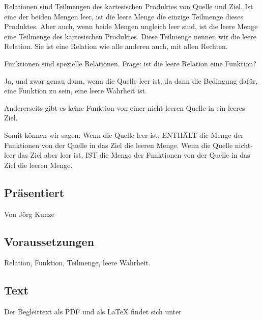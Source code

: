 \documentclass[a4paper]{amsart}
\theoremstyle{definition}
\begin{document}
Relationen sind Teilmengen des kartesischen Produktes von Quelle und Ziel. Ist eine der beiden Mengen leer, ist die leere Menge die einzige Teilmenge dieses Produktes. Aber auch, wenn beide Mengen ungleich leer sind, ist die leere Menge eine Teilmenge des kartesischen Produktes. Diese Teilmenge nennen wir die leere Relation. Sie ist eine Relation wie alle anderen auch, mit allen Rechten.

Funktionen sind spezielle Relationen. Frage: ist die leere Relation eine Funktion?

Ja, und zwar genau dann, wenn die Quelle leer ist, da dann die Bedingung dafür, eine Funktion zu sein, eine leere Wahrheit ist.

Andererseits gibt es keine Funktion von einer nicht-leeren Quelle in ein leeres Ziel. 

Somit können wir sagen:
Wenn die Quelle leer ist, ENTHÄLT die Menge der Funktionen von der Quelle in das Ziel die leeren Menge. Wenn die Quelle nicht-leer das Ziel aber leer ist, IST die Menge der Funktionen von der Quelle in das Ziel die leeren Menge.

\subsection*{Präsentiert}
Von Jörg Kunze

\subsection*{Voraussetzungen}
Relation, Funktion, Teilmenge, leere Wahrheit.

\subsection*{Text}
Der Begleittext als PDF und als LaTeX findet sich unter
{\tiny
   \url{}
}

\end{document}
